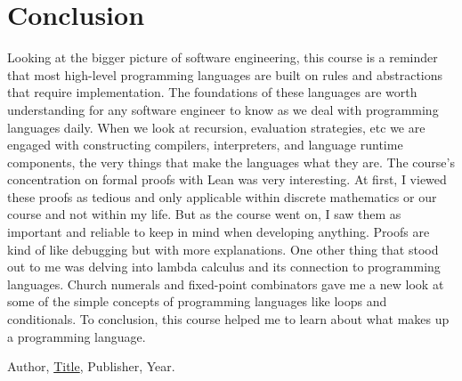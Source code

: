 \documentclass{article}
\theoremstyle{theorem}
\theoremstyle{definition}
\theoremstyle{remark}
\begin{document}
\section{Conclusion}\label{conclusion}
Looking at the bigger picture of software engineering, this course is a reminder that most high-level 
programming languages are built on rules and abstractions that require implementation. The foundations 
of these languages are worth understanding for any software engineer to know as we deal with programming 
languages daily. When we look at recursion, evaluation strategies, etc we are engaged with constructing 
compilers, interpreters, and language runtime components, the very things that make the languages what they are.
The course's concentration on formal proofs with Lean was very interesting. At first, I viewed these proofs 
as tedious and only applicable within discrete mathematics or our course and not within my life. But as the 
course went on, I saw them as important and reliable to keep in mind when developing anything. Proofs are kind 
of like debugging but with more explanations. One other thing that stood out to me was delving into lambda 
calculus and its connection to programming languages. Church numerals and fixed-point combinators gave me a 
new look at some of the simple concepts of programming languages like loops and conditionals. To conclusion,
 this course helped me to learn about what makes up a programming language. 



\begin{thebibliography}{99}
 Author, \href{https://en.wikipedia.org/wiki/LaTeX}{Title}, Publisher, Year.
\end{thebibliography}
\end{document}
